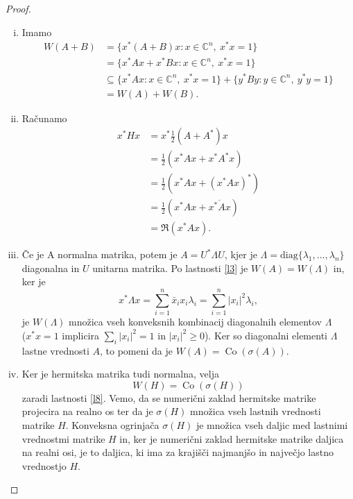 \documentclass[12pt,a4paper]{amsart}
\theoremstyle{definition}
\theoremstyle{plain}
\newcommand{\Co}{\operatorname{Co}} %
\newcommand{\C}{\mathbb C}
\begin{document}
\begin{proof}
\begin{enumerate}[(i)]
\item Imamo
\begin{align*}
W(A+B)&=\{x^\ast(A+B)x\! : x\in \C^n,\ x^\ast x=1\}\\
& = \{x^\ast Ax +x^\ast Bx\! : x\in \C^n,\ x^\ast x=1\}\\
& \subseteq \{x^\ast Ax\! : x\in \C^n,\ x^\ast x=1\}+\{y^\ast By\! : y\in \C^n,\ y^\ast y=1\}\\
& =W(A) + W(B).
\end{align*}
\item Računamo
\begin{align*}
x^\ast Hx &= x^\ast \frac{1}{2}(A+A^\ast)x \\
 &=\frac{1}{2} (x^\ast Ax +x^\ast A^\ast x) \\
 &=\frac{1}{2}(x^\ast Ax +(x^\ast Ax)^\ast) \\
 &= \frac{1}{2}(x^\ast Ax +\overline{x^\ast Ax}) \\
 &= \Re (x^\ast Ax).
\end{align*}

\item Če je A normalna matrika, potem je $A=U^\ast \Lambda U$, kjer je $\Lambda = \text{diag}\{\lambda_1, \dots, \lambda_n\}$ diagonalna in $U$ unitarna matrika. 
Po lastnosti \ref{l3} je $W(A)=W(\Lambda)$ in, ker je $$x^\ast \Lambda x = \sum_{i=1}^{n} \bar{x}_i x_i\lambda_i = \sum_{i=1}^{n} |x_i|^2 \lambda_i ,$$ 
je $W(\Lambda)$ množica vseh konveksnih kombinacij diagonalnih elementov $\Lambda$\\($x^\ast x=1$ implicira $ \sum_{i} |x_i|^2 =1$ in $|x_i|^2 \geq 0$). 
Ker so diagonalni elementi $\Lambda$ lastne vrednosti $A$, to pomeni da je $W(A) =\Co(\sigma(A))$.

\item Ker je hermitska matrika tudi normalna, velja $$W(H) = \Co(\sigma(H))$$ zaradi lastnosti \ref{l8}.
Vemo, da se numerični zaklad hermitske matrike projecira na realno os ter da je $\sigma(H)$ množica vseh lastnih vrednosti matrike $H$. 
Konveksna ogrinjača $\sigma(H)$ je množica vseh daljic med lastnimi vrednostmi matrike $H$ in, ker je numerični zaklad hermitske matrike daljica na realni osi, je to daljica, ki ima za krajišči najmanjšo in največjo lastno vrednostjo $H$.
\end{enumerate}
\end{proof}
\end{document}
